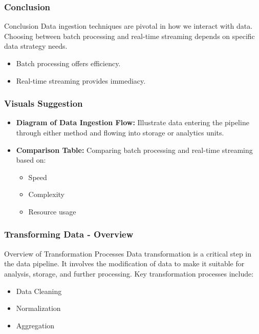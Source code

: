\documentclass[aspectratio=169]{beamer}
\begin{document}
\begin{frame}[fragile]
  \frametitle{Conclusion}
  \begin{block}{Conclusion}
    Data ingestion techniques are pivotal in how we interact with data. Choosing between batch processing and real-time streaming depends on specific data strategy needs. 
  \end{block}
  \begin{itemize}
    \item Batch processing offers efficiency.
    \item Real-time streaming provides immediacy.
  \end{itemize}
\end{frame}

\begin{frame}[fragile]
  \frametitle{Visuals Suggestion}
  \begin{itemize}
    \item \textbf{Diagram of Data Ingestion Flow:} Illustrate data entering the pipeline through either method and flowing into storage or analytics units.
    \item \textbf{Comparison Table:} Comparing batch processing and real-time streaming based on:
    \begin{itemize}
      \item Speed
      \item Complexity
      \item Resource usage
    \end{itemize}
  \end{itemize}
\end{frame}

\begin{frame}[fragile]
    \frametitle{Transforming Data - Overview}
    \begin{block}{Overview of Transformation Processes}
        Data transformation is a critical step in the data pipeline. 
        It involves the modification of data to make it suitable for analysis, storage, and further processing. Key transformation processes include:
    \end{block}
    
    \begin{itemize}
        \item Data Cleaning
        \item Normalization
        \item Aggregation
    \end{itemize}
\end{frame}
\end{document}
